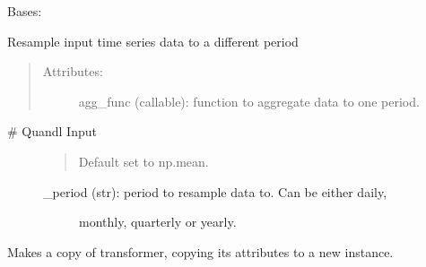 \documentclass[letterpaper,10pt,english]{sphinxmanual}
\begin{document}
\begin{fulllineitems}
\label{\detokenize{dalio.pipe:dalio.pipe.col_generation.Period}}
Bases: 

Resample input time series data to a different period
\begin{quote}
\begin{description}
\item[{Attributes:}] \leavevmode
agg\_func (callable): function to aggregate data to one period.

\end{description}
\end{quote}
\begin{description}
\item[{\# Quandl Input}] \leavevmode\begin{quote}

Default set to np.mean.
\end{quote}
\begin{description}
\item[{\_period (str): period to resample data to. Can be either daily,}] \leavevmode
monthly, quarterly or yearly.

\end{description}

\end{description}

\begin{fulllineitems}
\label{\detokenize{dalio.pipe:dalio.pipe.col_generation.Period.agg_func}}
\end{fulllineitems}


\begin{fulllineitems}
\label{\detokenize{dalio.pipe:dalio.pipe.col_generation.Period.copy}}
Makes a copy of transformer, copying its attributes to a new
instance.


\end{fulllineitems}
\end{fulllineitems}
\end{document}
